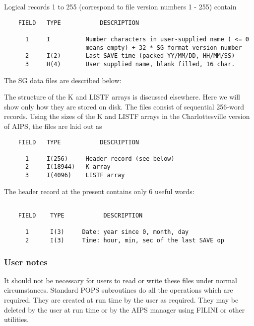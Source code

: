 Logical records 1 to 255 (correspond to file version numbers 1 - 255)
contain

\begin{verbatim}
    FIELD   TYPE           DESCRIPTION

      1     I          Number characters in user-supplied name ( <= 0
                       means empty) + 32 * SG format version number
      2     I(2)       Last SAVE time (packed YY/MM/DD, HH/MM/SS)
      3     H(4)       User supplied name, blank filled, 16 char.
\end{verbatim}

The SG data files are described below:

     The structure of the K and LISTF arrays is discussed elsewhere.
Here we will show only how they are stored on disk.  The files consist
of sequential 256-word records.  Using the sizes of the K and LISTF
arrays in the Charlottesville version of AIPS, the files are laid out
as

\begin{verbatim}
    FIELD   TYPE           DESCRIPTION

      1     I(256)     Header record (see below)
      2     I(18944)   K array
      3     I(4096)    LISTF array

\end{verbatim}
The header record at the present contains only 6 useful words:

\begin{verbatim}

    FIELD    TYPE           DESCRIPTION

      1      I(3)     Date: year since 0, month, day
      2      I(3)     Time: hour, min, sec of the last SAVE op

\end{verbatim}



\subsubsection{User notes}


     It should not be necessary for users to read or write these files
under normal circumstances.  Standard POPS subroutines do all the
operations which are required.  They are created at run time by the
user as required.  They may be deleted by the user at run time or by
the AIPS manager using FILINI or other utilities.



